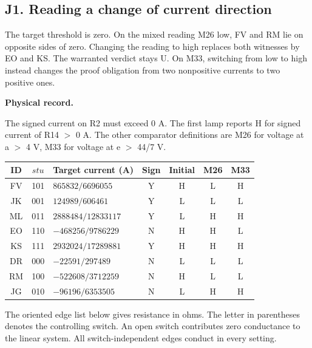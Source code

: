 \documentclass[12pt,letterpaper]{article}
\newcommand{\reading}[2]{\par\smallskip\textsf{\color{accent}\bfseries #1}\enspace #2\par}
\begin{document}
\subsection*{J1. Reading a change of current direction}

The target threshold is zero. On the mixed reading M26 low, FV and RM lie on opposite sides of zero. Changing the reading to high replaces both witnesses by EO and KS. The warranted verdict stays U. On M33, switching from low to high instead changes the proof obligation from two nonpositive currents to two positive ones.

\reading{Physical record.}{} The signed current on R2 must exceed $0$ A. The first lamp reports H for signed current of R14 $>$ 0 A. The other comparator definitions are M26 for voltage at a $>$ 4 V, M33 for voltage at e $>$ 44/7 V.

\begin{center}{\small\setlength{\tabcolsep}{4pt}\begin{tabularx}{\linewidth}{@{}ccYcccc@{}}\toprule
ID & $stu$ & Target current (A) & Sign & Initial & M26 & M33\\ \midrule
FV & 101 & $865832/6696055$ & Y & H & L & H\\
JK & 001 & $124989/606461$ & Y & L & L & L\\
ML & 011 & $2888484/12833117$ & Y & L & H & H\\
EO & 110 & $-468256/9786229$ & N & H & H & L\\
KS & 111 & $2932024/17289881$ & Y & H & H & H\\
DR & 000 & $-22591/297489$ & N & L & L & L\\
RM & 100 & $-522608/3712259$ & N & H & L & L\\
JG & 010 & $-96196/6353505$ & N & L & H & H\\
\bottomrule\end{tabularx}}\end{center}

The oriented edge list below gives resistance in ohms. The letter in parentheses denotes the controlling switch. An open switch contributes zero conductance to the linear system. All switch-independent edges conduct in every setting.
\end{document}
